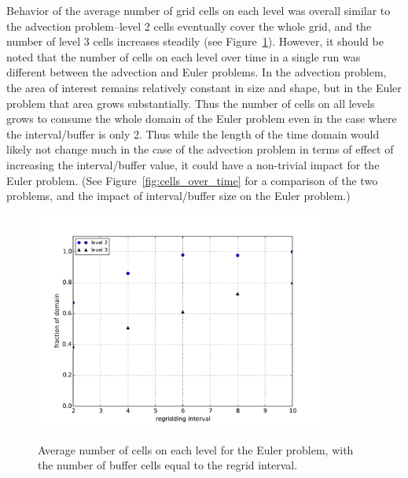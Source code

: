 \documentclass[11pt]{article}
\begin{document}
Behavior of the average number of grid cells on each level was overall
similar to the advection problem--level 2 cells eventually cover the whole grid,
and the number of level 3 cells increases steadily (see 
Figure~\ref{fig:avg_cells_euler}). However, it should be noted that the number of
cells on each level over time in a single run was different between the advection
and Euler problems. In the advection problem, the area of interest remains 
relatively constant in size and shape, but in the Euler problem that area
grows substantially. Thus the number of cells on all levels grows to consume
the whole domain of the Euler problem even in the case where the interval/buffer
is only 2. Thus while the length of the time domain would likely not change
much in the case of the advection problem in terms of effect of increasing
the interval/buffer value, it could have a non-trivial impact for the Euler
problem. (See Figure~\ref{fig:cells_over_time} for a comparison of the
two problems, and the impact of interval/buffer size on the Euler problem.)

\begin{figure}[!htb]
\centering
\caption{Average number of cells on each level for the
Euler problem, with the number of
buffer cells equal to the regrid interval.}
\includegraphics[width=0.85\textwidth]{myclaw/avg_cells_euler}
\label{fig:avg_cells_euler}
\end{figure}
\end{document}
